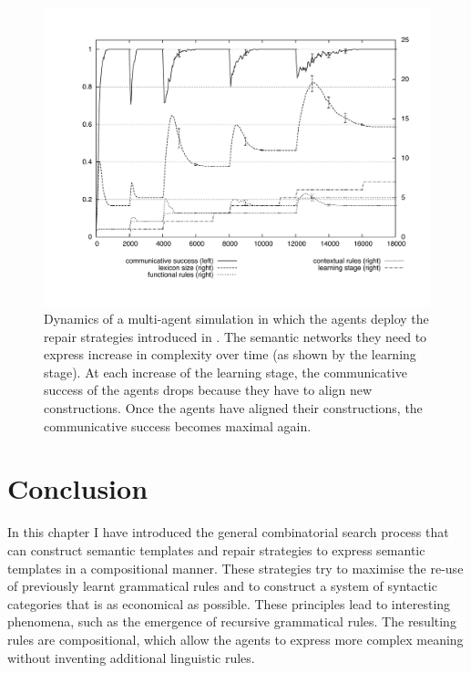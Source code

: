 \begin{figure}
  \begin{center}
    \includegraphics[width=.5\textwidth]{./composition/figures/learning-operators-graph.pdf}
    \caption[Resulting dynamics of repair strategies for predefined
    conceptualisations]{Dynamics of a multi-agent simulation in which
      the agents deploy the repair strategies introduced in . The semantic networks they
      need to express increase in complexity over time (as shown by
      the learning stage). At each increase of the learning stage, the
      communicative success of the agents drops because they have to
      align new constructions. Once the agents have aligned their
      constructions, the communicative success becomes maximal again.}
    \label{f:map-repair-strategies-graph}
  \end{center}
\end{figure}

\section{Conclusion}

In this chapter I have introduced the general combinatorial search
process that can construct semantic templates and repair strategies to
express semantic templates in a compositional manner. These strategies
try to maximise the re-use of previously learnt grammatical rules and
to construct a system of syntactic categories that is as economical as
possible. These principles lead to interesting phenomena, such as the
emergence of recursive grammatical rules. The resulting rules are
compositional, which allow the agents to express more complex meaning
without inventing additional linguistic rules.

\newpage
\thispagestyle{empty}